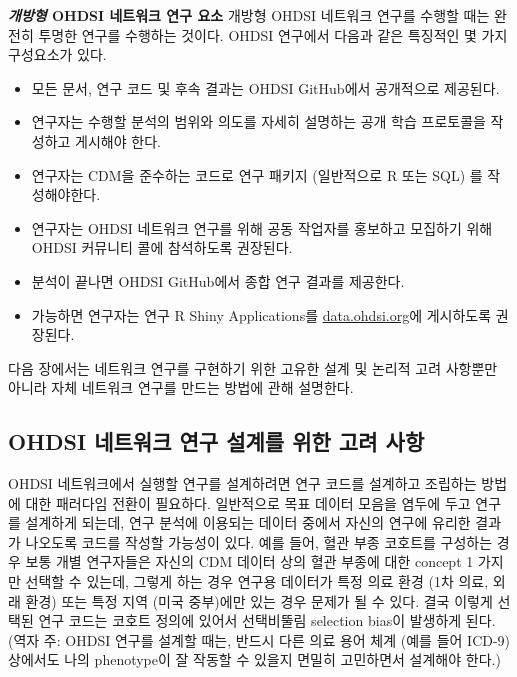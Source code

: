\documentclass[10.5pt]{book}
\providecommand{\tightlist}{%
  \setlength{\itemsep}{0pt}\setlength{\parskip}{0pt}}
\theoremstyle{definition}
\theoremstyle{definition}
\theoremstyle{definition}
\theoremstyle{remark}
\begin{document}
\textbf{\emph{개방형} OHDSI 네트워크 연구 요소} 개방형 OHDSI 네트워크
연구를 수행할 때는 완전히 투명한 연구를 수행하는 것이다. OHDSI 연구에서
다음과 같은 특징적인 몇 가지 구성요소가 있다.

\begin{itemize}
\tightlist
\item
  모든 문서, 연구 코드 및 후속 결과는 OHDSI GitHub에서 공개적으로
  제공된다.
\item
  연구자는 수행할 분석의 범위와 의도를 자세히 설명하는 공개 학습
  프로토콜을 작성하고 게시해야 한다.
\item
  연구자는 CDM을 준수하는 코드로 연구 패키지 (일반적으로 R 또는 SQL) 를
  작성해야한다.
\item
  연구자는 OHDSI 네트워크 연구를 위해 공동 작업자를 홍보하고 모집하기
  위해 OHDSI 커뮤니티 콜에 참석하도록 권장된다.
\item
  분석이 끝나면 OHDSI GitHub에서 종합 연구 결과를 제공한다.
\item
  가능하면 연구자는 연구 R Shiny Applications를
  \href{http://data.ohdsi.org}{data.ohdsi.org}에 게시하도록 권장된다.
\end{itemize}

다음 장에서는 네트워크 연구를 구현하기 위한 고유한 설계 및 논리적 고려
사항뿐만 아니라 자체 네트워크 연구를 만드는 방법에 관해 설명한다.

\subsection{OHDSI 네트워크 연구 설계를 위한 고려
사항}\label{ohdsi------}


OHDSI 네트워크에서 실행할 연구를 설계하려면 연구 코드를 설계하고
조립하는 방법에 대한 패러다임 전환이 필요하다. 일반적으로 목표 데이터
모음을 염두에 두고 연구를 설계하게 되는데, 연구 분석에 이용되는 데이터
중에서 자신의 연구에 유리한 결과가 나오도록 코드를 작성할 가능성이 있다.
예를 들어, 혈관 부종 코호트를 구성하는 경우 보통 개별 연구자들은 자신의
CDM 데이터 상의 혈관 부종에 대한 concept 1 가지만 선택할 수 있는데,
그렇게 하는 경우 연구용 데이터가 특정 의료 환경 (1차 의료, 외래 환경)
또는 특정 지역 (미국 중부)에만 있는 경우 문제가 될 수 있다. 결국 이렇게
선택된 연구 코드는 코호트 정의에 있어서 선택비뚤림 selection bias이
발생하게 된다. (역자 주: OHDSI 연구를 설계할 때는, 반드시 다른 의료 용어
체계 (예를 들어 ICD-9) 상에서도 나의 phenotype이 잘 작동할 수 있을지
면밀히 고민하면서 설계해야 한다.)
\end{document}

